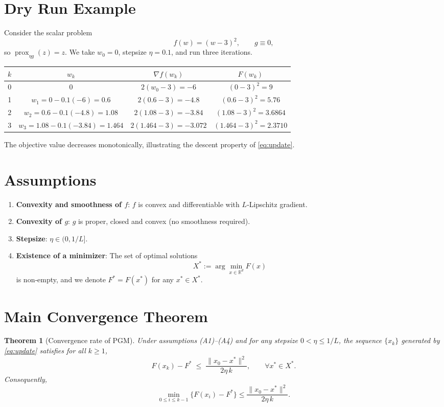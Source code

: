 \documentclass{article}
\newtheorem{theorem}{Theorem}
\begin{document}
\section*{Dry Run Example}
Consider the scalar problem
\[
f(w)=(w-3)^{2},\qquad g\equiv0,
\]
so $\operatorname{prox}_{\eta g}(z)=z$.  
We take $w_{0}=0$, stepsize $\eta=0.1$, and run three iterations.

\begin{center}
\begin{tabular}{c|c|c|c}
$k$ & $w_{k}$ & $\nabla f(w_{k})$ & $F(w_{k})$ \\ \hline
0 & $0$ & $2(w_{0}-3)=-6$ & $(0-3)^{2}=9$\\
1 & $w_{1}=0-0.1(-6)=0.6$ & $2(0.6-3)=-4.8$ & $(0.6-3)^{2}=5.76$\\
2 & $w_{2}=0.6-0.1(-4.8)=1.08$ & $2(1.08-3)=-3.84$ & $(1.08-3)^{2}=3.6864$\\
3 & $w_{3}=1.08-0.1(-3.84)=1.464$ & $2(1.464-3)=-3.072$ & $(1.464-3)^{2}=2.3710$\\
\end{tabular}
\end{center}
The objective value decreases monotonically, illustrating the descent property of \eqref{eq:update}.

\section*{Assumptions}
\begin{enumerate}[label=(A\arabic*)]
\item \textbf{Convexity and smoothness of $f$}: $f$ is convex and differentiable with $L$‑Lipschitz gradient.
\item \textbf{Convexity of $g$}: $g$ is proper, closed and convex (no smoothness required).
\item \textbf{Stepsize}: $\eta\in(0,1/L]$.
\item \textbf{Existence of a minimizer}: The set of optimal solutions 
\[
X^{*}:=\arg\min_{x\in\mathbb{R}^{d}}F(x)
\]
is non‑empty, and we denote $F^{*}=F(x^{*})$ for any $x^{*}\in X^{*}$.
\end{enumerate}

\section*{Main Convergence Theorem}
\begin{theorem}[Convergence rate of PGM]
\label{thm:main}
Under assumptions (A1)–(A4) and for any stepsize $0<\eta\le 1/L$, the sequence $\{x_{k}\}$ generated by \eqref{eq:update} satisfies for all $k\ge1$,
\begin{equation}
F(x_{k})-F^{*}\;\le\;\frac{\|x_{0}-x^{*}\|^{2}}{2\eta\,k},
\qquad\forall x^{*}\in X^{*}.
\label{eq:rate}
\end{equation}
Consequently,
\[
\min_{0\le i\le k-1}\bigl\{F(x_{i})-F^{*}\bigr\}\le\frac{\|x_{0}-x^{*}\|^{2}}{2\eta\,k}.
\]
\end{theorem}
\end{document}
